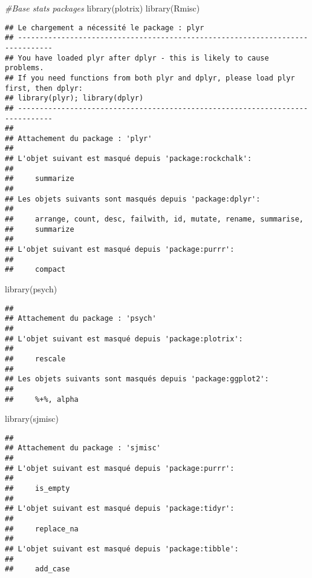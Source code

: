 \documentclass[
]{article}
\newenvironment{Shaded}{\begin{snugshade}}{\end{snugshade}}
\newcommand{\CommentTok}[1]{\textcolor[rgb]{0.56,0.35,0.01}{\textit{#1}}}
\newcommand{\FunctionTok}[1]{\textcolor[rgb]{0.00,0.00,0.00}{#1}}
\newcommand{\NormalTok}[1]{#1}
\begin{document}
\begin{Shaded}
\begin{Highlighting}[]
\CommentTok{\#Base stats packages}
\FunctionTok{library}\NormalTok{(plotrix)}
\FunctionTok{library}\NormalTok{(Rmisc)}
\end{Highlighting}
\end{Shaded}

\begin{verbatim}
## Le chargement a nécessité le package : plyr
## ------------------------------------------------------------------------------
## You have loaded plyr after dplyr - this is likely to cause problems.
## If you need functions from both plyr and dplyr, please load plyr first, then dplyr:
## library(plyr); library(dplyr)
## ------------------------------------------------------------------------------
## 
## Attachement du package : 'plyr'
## 
## L'objet suivant est masqué depuis 'package:rockchalk':
## 
##     summarize
## 
## Les objets suivants sont masqués depuis 'package:dplyr':
## 
##     arrange, count, desc, failwith, id, mutate, rename, summarise,
##     summarize
## 
## L'objet suivant est masqué depuis 'package:purrr':
## 
##     compact
\end{verbatim}

\begin{Shaded}
\begin{Highlighting}[]
\FunctionTok{library}\NormalTok{(psych)}
\end{Highlighting}
\end{Shaded}

\begin{verbatim}
## 
## Attachement du package : 'psych'
## 
## L'objet suivant est masqué depuis 'package:plotrix':
## 
##     rescale
## 
## Les objets suivants sont masqués depuis 'package:ggplot2':
## 
##     %+%, alpha
\end{verbatim}

\begin{Shaded}
\begin{Highlighting}[]
\FunctionTok{library}\NormalTok{(sjmisc)}
\end{Highlighting}
\end{Shaded}

\begin{verbatim}
## 
## Attachement du package : 'sjmisc'
## 
## L'objet suivant est masqué depuis 'package:purrr':
## 
##     is_empty
## 
## L'objet suivant est masqué depuis 'package:tidyr':
## 
##     replace_na
## 
## L'objet suivant est masqué depuis 'package:tibble':
## 
##     add_case
\end{verbatim}
\end{document}
